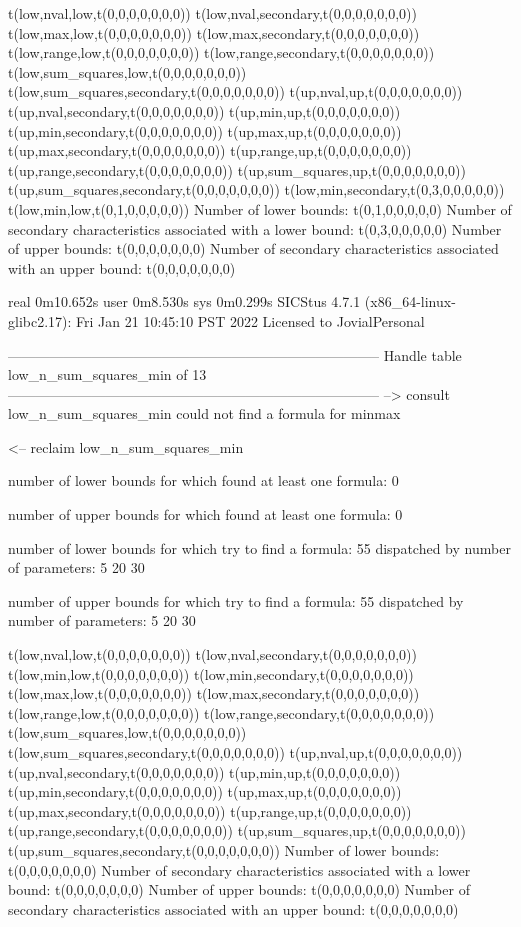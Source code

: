 t(low,nval,low,t(0,0,0,0,0,0,0))
t(low,nval,secondary,t(0,0,0,0,0,0,0))
t(low,max,low,t(0,0,0,0,0,0,0))
t(low,max,secondary,t(0,0,0,0,0,0,0))
t(low,range,low,t(0,0,0,0,0,0,0))
t(low,range,secondary,t(0,0,0,0,0,0,0))
t(low,sum_squares,low,t(0,0,0,0,0,0,0))
t(low,sum_squares,secondary,t(0,0,0,0,0,0,0))
t(up,nval,up,t(0,0,0,0,0,0,0))
t(up,nval,secondary,t(0,0,0,0,0,0,0))
t(up,min,up,t(0,0,0,0,0,0,0))
t(up,min,secondary,t(0,0,0,0,0,0,0))
t(up,max,up,t(0,0,0,0,0,0,0))
t(up,max,secondary,t(0,0,0,0,0,0,0))
t(up,range,up,t(0,0,0,0,0,0,0))
t(up,range,secondary,t(0,0,0,0,0,0,0))
t(up,sum_squares,up,t(0,0,0,0,0,0,0))
t(up,sum_squares,secondary,t(0,0,0,0,0,0,0))
t(low,min,secondary,t(0,3,0,0,0,0,0))
t(low,min,low,t(0,1,0,0,0,0,0))
Number of lower bounds:                                             t(0,1,0,0,0,0,0)
Number of secondary characteristics associated with a lower bound:  t(0,3,0,0,0,0,0)
Number of upper bounds:                                             t(0,0,0,0,0,0,0)
Number of secondary characteristics associated with an upper bound: t(0,0,0,0,0,0,0)

real	0m10.652s
user	0m8.530s
sys	0m0.299s
SICStus 4.7.1 (x86_64-linux-glibc2.17): Fri Jan 21 10:45:10 PST 2022
Licensed to JovialPersonal


--------------------------------------------------------------------------------
Handle table low_n_sum_squares_min of 13
--------------------------------------------------------------------------------
--> consult low_n_sum_squares_min
could not find a formula for minmax

<-- reclaim low_n_sum_squares_min

number of lower bounds for which found at least one formula: 0

number of upper bounds for which found at least one formula: 0

number of lower bounds for which try to find a formula: 55
dispatched by number of parameters: 5  20  30

number of upper bounds for which try to find a formula: 55
dispatched by number of parameters: 5  20  30

t(low,nval,low,t(0,0,0,0,0,0,0))
t(low,nval,secondary,t(0,0,0,0,0,0,0))
t(low,min,low,t(0,0,0,0,0,0,0))
t(low,min,secondary,t(0,0,0,0,0,0,0))
t(low,max,low,t(0,0,0,0,0,0,0))
t(low,max,secondary,t(0,0,0,0,0,0,0))
t(low,range,low,t(0,0,0,0,0,0,0))
t(low,range,secondary,t(0,0,0,0,0,0,0))
t(low,sum_squares,low,t(0,0,0,0,0,0,0))
t(low,sum_squares,secondary,t(0,0,0,0,0,0,0))
t(up,nval,up,t(0,0,0,0,0,0,0))
t(up,nval,secondary,t(0,0,0,0,0,0,0))
t(up,min,up,t(0,0,0,0,0,0,0))
t(up,min,secondary,t(0,0,0,0,0,0,0))
t(up,max,up,t(0,0,0,0,0,0,0))
t(up,max,secondary,t(0,0,0,0,0,0,0))
t(up,range,up,t(0,0,0,0,0,0,0))
t(up,range,secondary,t(0,0,0,0,0,0,0))
t(up,sum_squares,up,t(0,0,0,0,0,0,0))
t(up,sum_squares,secondary,t(0,0,0,0,0,0,0))
Number of lower bounds:                                             t(0,0,0,0,0,0,0)
Number of secondary characteristics associated with a lower bound:  t(0,0,0,0,0,0,0)
Number of upper bounds:                                             t(0,0,0,0,0,0,0)
Number of secondary characteristics associated with an upper bound: t(0,0,0,0,0,0,0)

